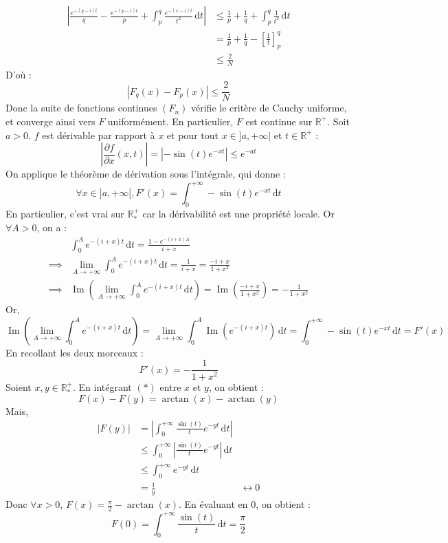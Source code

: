 \begin{demonstration}
		\begin{align*}
			\left| \frac{e^{-(q-i)t}}{q} - \frac{e^{-(p-i)t}}{p} +  \int_p^q \frac{e^{-(x-i)t}}{t^2} \, \mathrm{d}t \right| &\leq \frac{1}{p} + \frac{1}{q} + \int_p^q \frac{1}{t^2} \, \mathrm{d}t \\
			&= \frac{1}{p} + \frac{1}{q} - \left[ \frac{1}{t} \right]^q_p \\
			&\leq \frac{2}{N}
		\end{align*}
		D'où :
		\[ |F_q(x) - F_p(x)| \leq \frac{2}{N} \]
		Donc la suite de fonctions continues $(F_n)$ vérifie le critère de Cauchy uniforme, et converge ainsi vers $F$ uniformément. En particulier, $F$ est continue sur $\mathbb{R}^+$.
		\newpar
		Soit $a > 0$. $f$ est dérivable par rapport à $x$ et pour tout $x \in ]a, +\infty|$ et $t \in \mathbb{R}^+$ :
		\[ \left| \frac{\partial f}{\partial x} (x, t) \right| = |-\sin(t) e^{-xt}| \leq e^{-at} \]
		On applique le théorème de dérivation sous l'intégrale, qui donne :
		\[ \forall x \in ]a, +\infty[, F'(x) = \int_0^{+\infty} -\sin(t) e^{-xt} \, \mathrm{d}t \]
		En particulier, c'est vrai sur $\mathbb{R}^+_*$ car la dérivabilité est une propriété locale. Or $\forall A > 0$, on a :
		\begin{align*}
			& \int_0^A e^{-(i+x)t} \, \mathrm{d}t = \frac{1-e^{-(i+x)A}}{i+x} \\
			\implies & \lim_{A \rightarrow +\infty} \int_0^A e^{-(i+x)t} \, \mathrm{d}t = \frac{1}{i+x} = \frac{-i+x}{1 + x^2} \\
			\implies & \operatorname{Im} \left( \lim_{A \rightarrow +\infty} \int_0^A e^{-(i+x)t} \, \mathrm{d}t \right) = \operatorname{Im} \left( \frac{-i+x}{1 + x^2} \right) = -\frac{1}{1 + x^2}
		\end{align*}
		Or,
		\[ \operatorname{Im} \left( \lim_{A \rightarrow +\infty} \int_0^A e^{-(i+x)t} \, \mathrm{d}t \right) = \lim_{A \rightarrow +\infty} \int_0^A \operatorname{Im} \left( e^{-(i+x)t} \right) \, \mathrm{d}t = \int_0^{+\infty} -\sin(t) e^{-xt} \, \mathrm{d}t = F'(x) \]
		En recollant les deux morceaux :
		\[ F'(x) = -\frac{1}{1+x^2} \tag{$*$} \]
		\newpar
		Soient $x, y \in \mathbb{R}^+_*$. En intégrant $(*)$ entre $x$ et $y$, on obtient :
		\[ F(x) - F(y) = \arctan(x) - \arctan(y) \]
		Mais,
		\begin{align*}
			|F(y)| &= \left| \int_0^{+\infty} \frac{\sin(t)}{t} e^{-yt} \, \mathrm{d}t \right| \\
			&\leq \int_0^{+\infty} \left| \frac{\sin(t)}{t} e^{-yt} \right| \, \mathrm{d}t \\
			&\leq \int_0^{+\infty} e^{-yt} \, \mathrm{d}t \\
			&= \frac{1}{y}
			&\longleftrightarrow 0
		\end{align*}
		Donc $\forall x > 0$, $F(x) = \frac{\pi}{2} - \arctan(x)$. En évaluant en $0$, on obtient :
		\[ F(0) = \int_0^{+\infty} \frac{\sin(t)}{t} \, \mathrm{d}t = \frac{\pi}{2} \]
	\end{demonstration}

